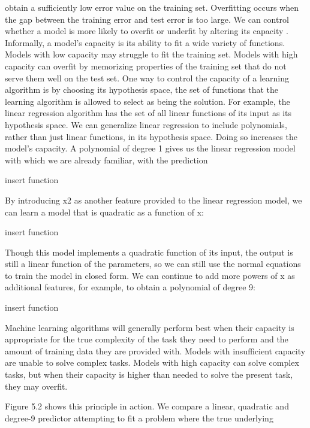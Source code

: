 \documentclass[11pt]{article}
\begin{document}
obtain a suﬃciently low error value on the training set. Overﬁtting occurs when
the gap between the training error and test error is too large.
We can control whether a model is more likely to overﬁt or underﬁt by altering
its
capacity
. Informally, a model’s capacity is its ability to ﬁt a wide variety of
functions. Models with low capacity may struggle to ﬁt the training set. Models
with high capacity can overﬁt by memorizing properties of the training set that do
not serve them well on the test set.
One way to control the capacity of a learning algorithm is by choosing its
hypothesis space, the set of functions that the learning algorithm is allowed to
select as being the solution. For example, the linear regression algorithm has the
set of all linear functions of its input as its hypothesis space. We can generalize
linear regression to include polynomials, rather than just linear functions, in its
hypothesis space. Doing so increases the model’s capacity.
A polynomial of degree 1 gives us the linear regression model with which we
are already familiar, with the prediction

    insert function

By introducing x2 as another feature provided to the linear regression model, we can learn a model that is quadratic as a function of x:

    insert function

Though this model implements a quadratic function of its input, the output is still a linear function of the parameters, so we can still use the normal equations to train the model in closed form.
We can continue to add more powers of x as additional features, for example, to obtain a polynomial of degree 9:

    insert function

Machine learning algorithms will generally perform best when their capacity
is appropriate for the true complexity of the task they need to perform and the
amount of training data they are provided with. Models with insuﬃcient capacity
are unable to solve complex tasks. Models with high capacity can solve complex
tasks, but when their capacity is higher than needed to solve the present task, they
may overﬁt.

Figure 5.2 shows this principle in action. We compare a linear, quadratic
and degree-9 predictor attempting to ﬁt a problem where the true underlying
\end{document}
